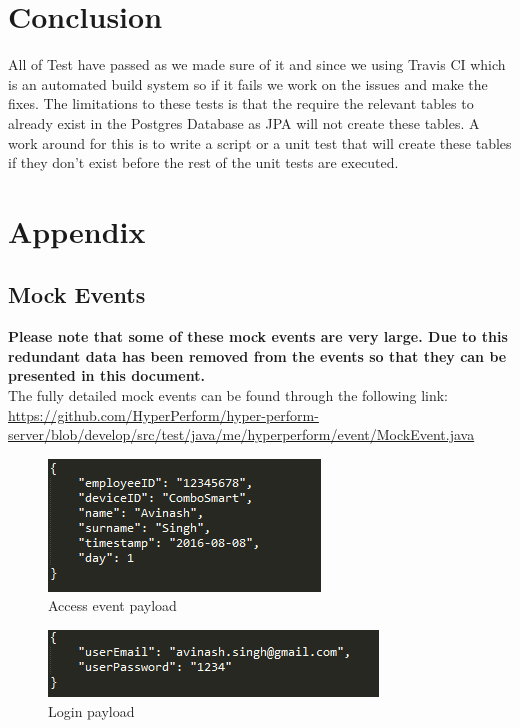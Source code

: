 \documentclass[11pt,a4paper]{article}
\begin{document}
\section{Conclusion}
All of Test have passed as we made sure of it and since we using Travis CI which is an automated build system so if it fails we work on the issues and make the fixes. The limitations to these tests is that the require the relevant tables to already exist in the Postgres Database as JPA will not create these tables. A work around for this is to write a script or a unit test that will create these tables if they don't exist before the rest of the unit tests are executed.

\newpage

\section{Appendix}

\subsection{Mock Events}
\textbf{Please note that some of these mock events are very large. Due to this redundant data has been removed from the events so that they can be presented in this document.} \\

The fully detailed mock events can be found through the following link: \url{https://github.com/HyperPerform/hyper-perform-server/blob/develop/src/test/java/me/hyperperform/event/MockEvent.java} \\

\begin{figure}[H]
	\centering
	\includegraphics[scale=1.0]{../Images/accessEvent}
	\caption{Access event payload}
\end{figure}
 
\begin{figure}[H]
	\centering
	\includegraphics[scale=1.0]{../Images/loginEvent}
	\caption{Login payload}
\end{figure}
\end{document}
